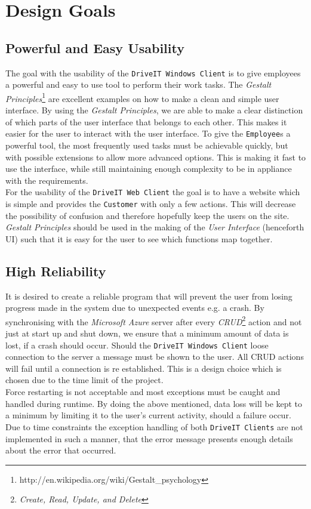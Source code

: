 \section{Design Goals}
\subsection{Powerful and Easy Usability}
The goal with the usability of the \texttt{DriveIT Windows Client} is to give employees a powerful and easy to use tool to perform their work tasks. The \textit{Gestalt Principles}\footnote{http://en.wikipedia.org/wiki/Gestalt_psychology} are excellent examples on how to make a clean and simple user interface. By using the \textit{Gestalt Principles}, we are able to make a clear distinction of which parts of the user interface that belongs to each other. This makes it easier for the user to interact with the user interface. To give the \texttt{Employee}s a powerful tool, the most frequently used tasks must be achievable quickly, but with possible extensions to allow more advanced options. This is making it fast to use the interface, while still maintaining enough complexity to be in appliance with the requirements.\\

For the usability of the \texttt{DriveIT Web Client} the goal is to have a website which is simple and provides the \texttt{Customer} with only a few actions. This will decrease the possibility of confusion and therefore hopefully keep the users on the site. \textit{Gestalt Principles} should be used in the making of the \textit{User Interface} (henceforth UI) such that it is easy for the user to see which functions map together.

\subsection{High Reliability} It is desired to create a reliable program that will prevent the user from losing progress made in the system due to unexpected events e.g. a crash. By synchronising with the \textit{Microsoft Azure} server after every \textit{CRUD}\footnote{\textit{Create, Read, Update, and Delete}} action and not just at start up and shut down, we ensure that a minimum amount of data is lost, if a crash should occur. Should the \texttt{DriveIT Windows Client} loose connection to the server a message must be shown to the user. All CRUD actions will fail until a connection is re established. This is a design choice which is chosen due to the time limit of the project. \\
Force restarting is not acceptable and most exceptions must be caught and handled during runtime. By doing the above mentioned, data loss will be kept to a minimum by limiting it to the user's current activity, should a failure occur. Due to time constraints the exception handling of both \texttt{DriveIT Clients} are not implemented in such a manner, that the error message presents enough details about the error that occurred.

